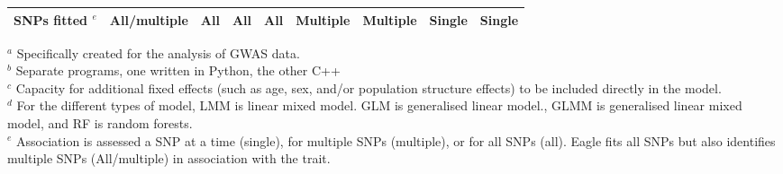 \documentclass{article}
\begin{document}
\begin{landscape}
\begin{table}
\begin{tabular}{lcccccccc}
\hspace{1mm} SNPs fitted $^e$      &    All/multiple      &    All       &   All        &      All          &  Multiple          &  Multiple              &   Single   &  Single   \\  [0.15cm]  \hline




\end{tabular}
{$^a$ \scriptsize{Specifically created for the analysis of GWAS data.}}\\
{$^b$ \scriptsize{Separate programs, one written in Python, the other C++}} \\
{$^c$ \scriptsize{Capacity for additional fixed effects (such as  age, sex, and/or population structure effects) to be included directly in the model.}} \\
{$^d$ \scriptsize{For the different types of model, 
LMM is linear mixed model.  GLM is generalised linear model., GLMM is generalised linear mixed model, and RF is random forests.}} \\
{$^e$ \scriptsize{Association is assessed a SNP at a time (single), for multiple SNPs (multiple), or for all SNPs (all). Eagle fits all SNPs but also identifies multiple SNPs (All/multiple) in association with the trait.} } \\
\end{table}


\end{landscape}
\end{document}
